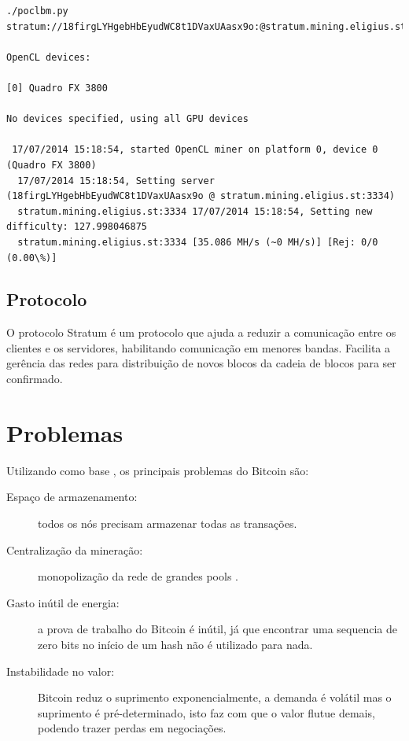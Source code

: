 \documentclass[a4paper,11pt]{article}
\theoremstyle{mytheor}
\begin{document}
\begin{lstlisting}[Exemplo de utilização do minerador conectando-se ao pool Eligius]
./poclbm.py  stratum://18firgLYHgebHbEyudWC8t1DVaxUAasx9o:@stratum.mining.eligius.st:3334

OpenCL devices:

[0] Quadro FX 3800

No devices specified, using all GPU devices

 17/07/2014 15:18:54, started OpenCL miner on platform 0, device 0 (Quadro FX 3800)
  17/07/2014 15:18:54, Setting server (18firgLYHgebHbEyudWC8t1DVaxUAasx9o @ stratum.mining.eligius.st:3334)
  stratum.mining.eligius.st:3334 17/07/2014 15:18:54, Setting new difficulty: 127.998046875
  stratum.mining.eligius.st:3334 [35.086 MH/s (~0 MH/s)] [Rej: 0/0 (0.00\%)]

\end{lstlisting}

\subsection*{Protocolo}
O protocolo Stratum é um protocolo que ajuda a reduzir a comunicação entre os clientes e os servidores, habilitando comunicação em menores bandas. Facilita a gerência das redes para distribuição de novos blocos da cadeia de blocos para ser confirmado.

\section*{Problemas}
Utilizando como base \cite{hardProblems}, os principais problemas do Bitcoin são:

\begin{description}
\item[Espaço de armazenamento:] todos os nós precisam armazenar todas as transações.
\item[Centralização da mineração:] monopolização da rede de grandes pools \cite{pools}.
\item[Gasto inútil de energia:] a prova de trabalho do Bitcoin é inútil, já que encontrar uma sequencia de zero bits no início de um hash não é utilizado para nada. 

\item[Instabilidade no valor:] Bitcoin reduz o suprimento exponencialmente, a demanda é volátil mas o suprimento é pré-determinado, isto faz com que o valor flutue demais, podendo trazer perdas em negociações.
\end{description}
\end{document}
